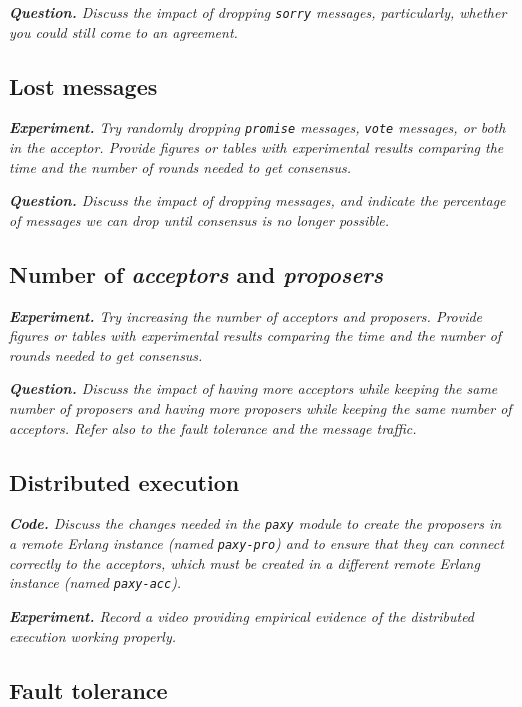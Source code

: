 \documentclass[a4paper, 10pt]{article}
\begin{document}
{\setlength{\parskip}{10pt}\noindent\textit{\textbf{Question.} Discuss the impact of dropping \texttt{sorry} messages, particularly, whether you could still come to an agreement.}}

\subsection{Lost messages}

\textit{\textbf{Experiment.} Try randomly dropping \texttt{promise} messages, \texttt{vote} messages, or both in the acceptor. Provide figures or tables with experimental results comparing the time and the number of rounds needed to get consensus.}
 
{\setlength{\parskip}{10pt}\noindent\textit{\textbf{Question.} Discuss the impact of dropping messages, and indicate the percentage of messages we can drop until consensus is no longer possible.}}

\subsection{Number of \textit{acceptors} and \textit{proposers}}

\textit{\textbf{Experiment.} Try increasing the number of acceptors and proposers. Provide figures or tables with experimental results comparing the time and the number of rounds needed to get consensus.}

{\setlength{\parskip}{10pt}\noindent\textit{\textbf{Question.} Discuss the impact of having more acceptors while keeping the same number of proposers and having more proposers while keeping the same number of acceptors. Refer also to the fault tolerance and the message traffic.}}

\subsection{Distributed execution}

\textit{\textbf{Code.} Discuss the changes needed in the \texttt{paxy} module to create the proposers in a remote Erlang instance (named \texttt{paxy-pro}) and to ensure that they can connect correctly to the acceptors, which must be created in a different remote Erlang instance (named \texttt{paxy-acc}).}

{\setlength{\parskip}{10pt}\noindent\textit{\textbf{Experiment.} Record a video providing empirical evidence of the distributed execution working properly.}}

\subsection{Fault tolerance}
\end{document}
